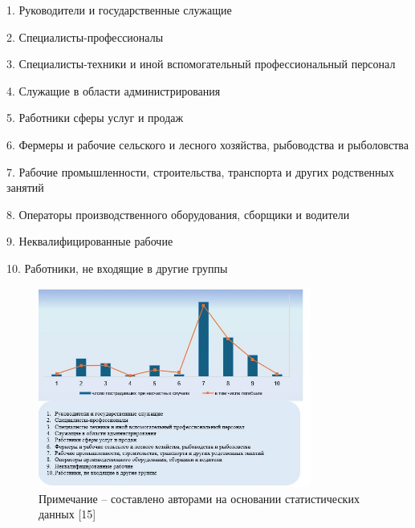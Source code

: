 \begin{multicols}{2}
1. Руководители и государственные служащие

2. Специалисты-профессионалы

3. Специалисты-техники и иной вспомогательный профессиональный персонал

4. Служащие в области администрирования

5. Работники сферы услуг и продаж

6. Фермеры и рабочие сельского и лесного хозяйства, рыбоводства и
рыболовства

7. Рабочие промышленности, строительства, транспорта и других
родственных занятий

8. Операторы производственного оборудования, сборщики и водители

9. Неквалифицированные рабочие

10. Работники, не входящие в другие группы
\end{multicols}


\begin{figure}[H]
	\centering
	\includegraphics[width=0.8\textwidth]{media/ekon/image5.2}
	\caption*{Рис. 2 - Анализ числа пострадавших и погибших при НСТ по роду
  деятельности (в среднем за 2019--2023 гг.), чел.}
  \caption*{Примечание -- составлено авторами на основании статистических
  данных {[}15{]}}
\end{figure}

